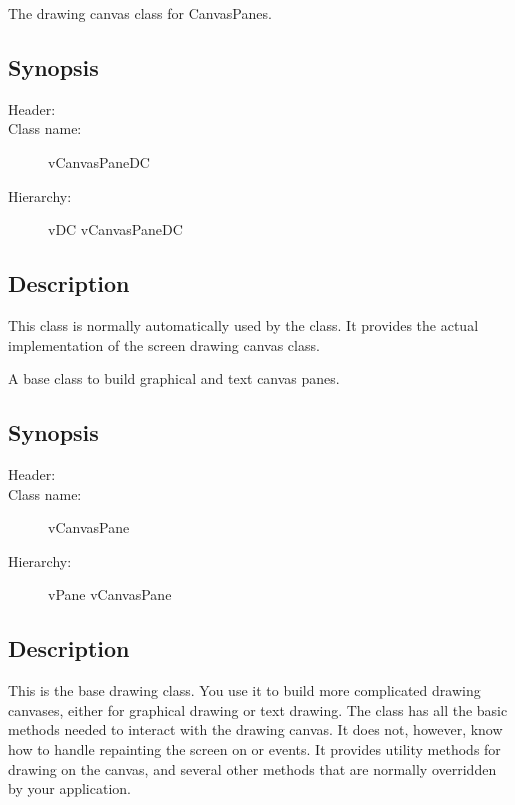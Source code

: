 

The drawing canvas class for CanvasPanes.

\subsection* {Synopsis}

\begin{description}
	\item [Header:] 
	\item [Class name:] vCanvasPaneDC
 	\item [Hierarchy:] vDC \rta vCanvasPaneDC
\end{description}

\subsection* {Description}

This class is normally automatically used by the 
class. It provides the actual implementation of the screen drawing
canvas class. 



A base class to build graphical and text canvas panes.

\subsection* {Synopsis}

\begin{description}
	\item [Header:] 
	\item [Class name:] vCanvasPane
 	\item [Hierarchy:] vPane \rta vCanvasPane
\end{description}

\subsection* {Description}

This is the base drawing class. You use it to build more complicated
drawing canvases, either for graphical drawing or text drawing.
The  class has all the basic methods needed to
interact with the drawing canvas. It does not, however, know
how to handle repainting the screen on  or 
events. It provides utility methods for drawing on the canvas,
and several other methods that are normally overridden by your
application.

